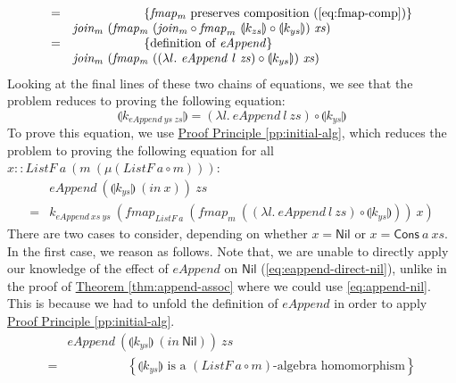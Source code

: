 \documentclass{jfp1}
\newcommand{\fold}[1]{\llparenthesis #1 \rrparenthesis}
\newcommand{\eqAnnotation}[1]{\hspace{2cm}\left\{\textrm{#1}\right\}}
\newcommand{\proofprinref}[1]{\hyperref[#1]{Proof Principle \ref*{#1}}}
\newcommand{\thmref}[1]{\hyperref[#1]{Theorem \ref*{#1}}}
\begin{document}
\begin{proof*}
\begin{displaymath}
\begin{array}{cl}
      =&\eqAnnotation{$\mathit{fmap_m}$ preserves composition (\autoref{eq:fmap-comp})} \\
      &\mathit{join_m}~(\mathit{fmap_m}~(\mathit{join_m} \circ \mathit{fmap}_m~\fold{k_{zs}} \circ \fold{k_{ys}})~\mathit{xs}) \\
      =&\eqAnnotation{definition of $\mathit{eAppend}$} \\
      &\mathit{join_m}~(\mathit{fmap_m}~((\lambda l.~\mathit{eAppend}~l~\mathit{zs}) \circ \fold{k_{ys}})~\mathit{xs})
    \end{array}
  \end{displaymath}
  Looking at the final lines of these two chains of equations, we see
  that the problem reduces to proving the following equation:
  \begin{displaymath}
    \fold{k_{\mathit{eAppend}~\mathit{ys}~\mathit{zs}}} = (\lambda l.~\mathit{eAppend}~l~\mathit{zs}) \circ \fold{k_{ys}}
  \end{displaymath}
  To prove this equation, we use \proofprinref{pp:initial-alg}, which
  reduces the problem to proving the following equation for all $x ::
  \mathit{ListF}~a~(m~(\mu(\mathit{ListF}~a \circ m)))$:
  \begin{displaymath}
    \begin{array}{cl}
      &\mathit{eAppend}~(\fold{k_{ys}}~(\mathit{in}~x))~\mathit{zs} \\
      =& k_{\mathit{eAppend}~\mathit{xs}~\mathit{ys}}~(\mathit{fmap}_{\mathit{ListF}~a}~(\mathit{fmap}_m~((\lambda l.~\mathit{eAppend}~l~\mathit{zs}) \circ \fold{k_{ys}}))~x)
    \end{array}
  \end{displaymath}
  There are two cases to consider, depending on whether $x =
  \mathsf{Nil}$ or $x = \mathsf{Cons}~a~\mathit{xs}$. In the first
  case, we reason as follows. Note that, we are unable to directly
  apply our knowledge of the effect of $\mathit{eAppend}$ on
  $\mathsf{Nil}$ (\autoref{eq:eappend-direct-nil}), unlike in the
  proof of \thmref{thm:append-assoc} where we could use
  \autoref{eq:append-nil}. This is because we had to unfold the
  definition of $\mathit{eAppend}$ in order to apply
  \proofprinref{pp:initial-alg}.
  \begin{displaymath}
    \begin{array}{cl}
      &\mathit{eAppend}~(\fold{k_{ys}}~(\mathit{in}~\mathsf{Nil}))~\mathit{zs} \\
      =&\eqAnnotation{$\fold{k_{ys}}$ is a $(\mathit{ListF}~a \circ m)$-algebra homomorphism} \\

\end{array}
\end{displaymath}
\end{proof*}
\end{document}
